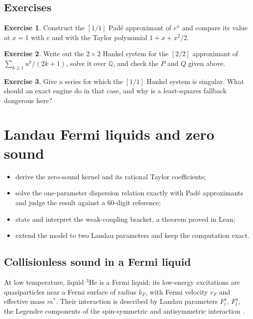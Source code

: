 \documentclass[11pt,a4paper,openany]{book}
\newcommand{\Q}{\mathbb{Q}}
\theoremstyle{definition}
\newtheorem{exercise}{Exercise}[chapter]
\theoremstyle{plain}
\begin{document}
\section*{Exercises}
\begin{exercise}\label{ex:padeexp}
Construct the $[1/1]$ Padé approximant of $e^x$ and compare its value at $x=1$ with $e$ and with
the Taylor polynomial $1+x+x^2/2$.
\end{exercise}
\begin{exercise}\label{ex:pade22}
Write out the $2\times2$ Hankel system for the $[2/2]$ approximant of $\sum_{k\ge1}u^k/(2k+1)$,
solve it over $\Q$, and check the $P$ and $Q$ given above.
\end{exercise}
\begin{exercise}\label{ex:singular}
Give a series for which the $[1/1]$ Hankel system is singular. What should an exact engine do in
that case, and why is a least-squares fallback dangerous here?
\end{exercise}

\chapter{Landau Fermi liquids and zero sound}
\label{ch:zerosound}

\begin{objectives}
\begin{itemize}
  \item derive the zero-sound kernel and its rational Taylor coefficients;
  \item solve the one-parameter dispersion relation exactly with Padé approximants and judge the
        result against a 60-digit reference;
  \item state and interpret the weak-coupling bracket, a theorem proved in Lean;
  \item extend the model to two Landau parameters and keep the computation exact.
\end{itemize}
\end{objectives}

\section{Collisionless sound in a Fermi liquid}

At low temperature, liquid $^3$He is a Fermi liquid: its low-energy excitations are quasiparticles
near a Fermi surface of radius $k_F$, with Fermi velocity $v_F$ and effective mass $m^*$. Their
interaction is described by Landau parameters $F_l^s$, $F_l^a$, the Legendre components of the
spin-symmetric and antisymmetric interaction \cite{pinesnozieres}.
\end{document}
